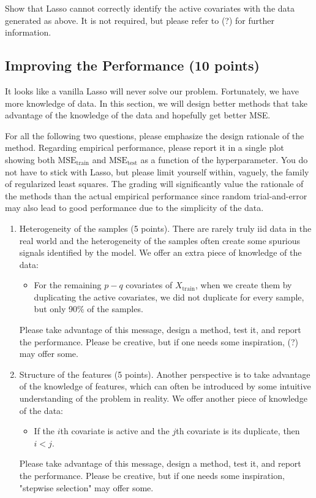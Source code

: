 \documentclass{article}
\begin{document}
Show that Lasso cannot correctly identify the active covariates with the data generated as above. It is
not required, but please refer to (?) for further information.

\subsection{Improving the Performance (10 points)}

It looks like a vanilla Lasso will never solve our problem. Fortunately, we have more knowledge of data. In
this section, we will design better methods that take advantage of the knowledge of the data and hopefully
get better MSE.

For all the following two questions, please emphasize the design rationale of the method. Regarding
empirical performance, please report it in a single plot showing both $\text{MSE}_{\text{train}}$ and $\text{MSE}_{\text{test}}$ as a function
of the hyperparameter. You do not have to stick with Lasso, but please limit yourself within, vaguely, the
family of regularized least squares. The grading will significantly value the rationale of the methods than
the actual empirical performance since random trial-and-error may also lead to good performance due to the
simplicity of the data.

\begin{enumerate}[label=(\alph*)]
\item Heterogeneity of the samples (5 points). There are rarely truly iid data in the real world and the
heterogeneity of the samples often create some spurious signals identified by the model. We offer an
extra piece of knowledge of the data:
\begin{itemize}
\item For the remaining $p - q$ covariates of $X_{\text{train}}$, when we create them by duplicating the active
covariates, we did not duplicate for every sample, but only 90\% of the samples.
\end{itemize}
Please take advantage of this message, design a method, test it, and report the performance. Please
be creative, but if one needs some inspiration, (?) may offer some.

\item Structure of the features (5 points). Another perspective is to take advantage of the knowledge of
features, which can often be introduced by some intuitive understanding of the problem in reality. We
offer another piece of knowledge of the data:
\begin{itemize}
\item If the $i$th covariate is active and the $j$th covariate is its duplicate, then $i < j$.
\end{itemize}
Please take advantage of this message, design a method, test it, and report the performance. Please
be creative, but if one needs some inspiration, "stepwise selection" may offer some.
\end{enumerate}
\end{document}

